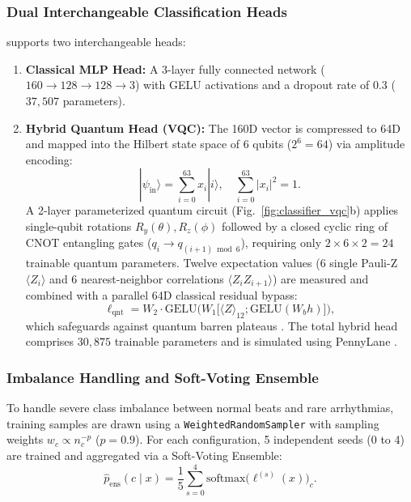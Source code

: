 \subsubsection{Dual Interchangeable Classification Heads}
\RRN{} supports two interchangeable heads:
\begin{enumerate}
    \item \textbf{Classical MLP Head:} A 3-layer fully connected network ($160 \to 128 \to 128 \to 3$) with GELU activations and a dropout rate of $0.3$ ($37{,}507$ parameters).
    \item \textbf{Hybrid Quantum Head (VQC):} The 160D vector is compressed to 64D and mapped into the Hilbert state space of 6 qubits ($2^6 = 64$) via amplitude encoding:
    \begin{equation}
    |\psi_{\mathrm{in}}\rangle = \sum_{i=0}^{63} x_i |i\rangle, \quad \sum_{i=0}^{63} |x_i|^2 = 1.
    \end{equation}
    A 2-layer parameterized quantum circuit (Fig.~\ref{fig:classifier_vqc}b) applies single-qubit rotations $R_y(\theta), R_z(\phi)$ followed by a closed cyclic ring of CNOT entangling gates ($q_i \to q_{(i+1)\bmod 6}$), requiring only $2 \times 6 \times 2 = 24$ trainable quantum parameters. Twelve expectation values (6 single Pauli-Z $\langle Z_i \rangle$ and 6 nearest-neighbor correlations $\langle Z_i Z_{i+1} \rangle$) are measured and combined with a parallel 64D classical residual bypass:
    \begin{equation}
    \ell_{\mathrm{qnt}} = W_2 \cdot \mathrm{GELU}\Big(W_1 \big[\langle Z \rangle_{12}; \mathrm{GELU}(W_b h)\big]\Big),
    \end{equation}
    which safeguards against quantum barren plateaus \cite{mcclean2018}. The total hybrid head comprises $30{,}875$ trainable parameters and is simulated using PennyLane \cite{pennylane2018}.
\end{enumerate}

\subsubsection{Imbalance Handling and Soft-Voting Ensemble}
To handle severe class imbalance between normal beats and rare arrhythmias, training samples are drawn using a \texttt{WeightedRandomSampler} with sampling weights $w_c \propto n_c^{-p}$ ($p=0.9$). For each configuration, 5 independent seeds (0 to 4) are trained and aggregated via a Soft-Voting Ensemble:
\begin{equation}
\hat{p}_{\mathrm{ens}}(c \mid x) = \frac{1}{5}\sum_{s=0}^4 \mathrm{softmax}\big(\ell^{(s)}(x)\big)_c.
\end{equation}
